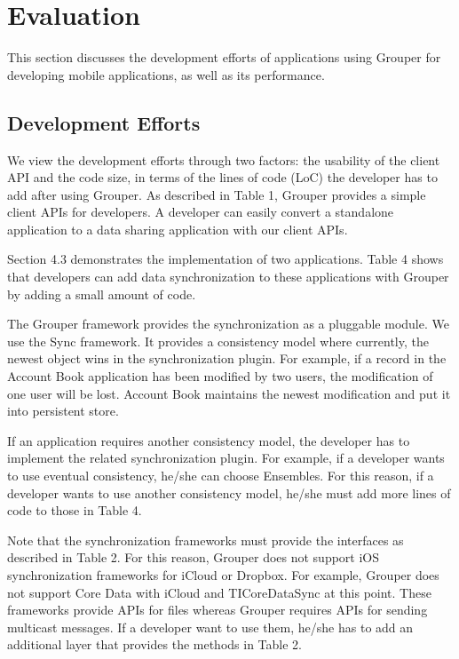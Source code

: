 \documentclass[sigconf]{acmart}
\begin{document}
\section{Evaluation}

This section discusses the development efforts of applications using Grouper for developing mobile applications, as well as its performance.

\subsection{Development Efforts}

We view the development efforts through two factors: the usability of the client API and the code size, in terms of the lines of code (LoC) the developer has to add after using Grouper. 
As described in Table 1, Grouper provides a simple client APIs for developers.
A developer can easily convert a standalone application to a data sharing application with our client APIs.

Section 4.3 demonstrates the implementation of two applications.
Table 4 shows that developers can add data synchronization to these applications with Grouper by adding a small amount of code. 

The Grouper framework provides the synchronization as a pluggable module.
We use the Sync\cite{sync} framework.
It provides a consistency model where currently, the newest object wins in the synchronization plugin.
For example, if a record in the Account Book application has been modified by two users, the modification of one user will be lost.
Account Book maintains the newest modification and put it into persistent store.

If an application requires another consistency model, the developer has to implement the related synchronization plugin.
For example, if a developer wants to use eventual consistency, he/she can choose Ensembles\cite{ensembles}.
For this reason, if a developer wants to use another consistency model, he/she must add more lines of code to those in Table 4.

Note that the synchronization frameworks must provide the interfaces as described in Table 2.
For this reason, Grouper does not support iOS synchronization frameworks for iCloud or Dropbox.
For example, Grouper does not support Core Data with iCloud\cite{coredata} and TICoreDataSync\cite{ticoredatasyn} at this point.
These frameworks provide APIs for files whereas Grouper requires APIs for sending multicast messages.
If a developer want to use them, he/she has to add an additional layer that provides the methods in Table 2.
\end{document}
